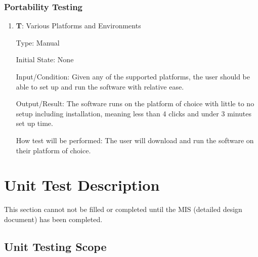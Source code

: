 \documentclass[12pt, titlepage]{article}
\newcounter{testnum} %
\begin{document}
\subsubsection{Portability Testing}
\begin{enumerate}

  \item{\textbf{T\thetestnum \label{T_portability}}: Various Platforms and Environments\\}

  Type: Manual
            
  Initial State: None
            
  Input/Condition: Given any of the supported platforms, the user should be able to set up and 
  run the software with relative ease.
            
  Output/Result: The software runs on the platform of choice with little to no setup including 
  installation, meaning less than 4 clicks and under 3 minutes set up time.
            
  How test will be performed: The user will download and run the software on their platform of choice.
  
\end{enumerate}

\section{Unit Test Description} \label{sec_unittest}

This section cannot not be filled or completed until the MIS (detailed design document) has been completed.

\subsection{Unit Testing Scope}


\end{document}
